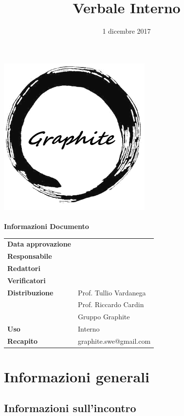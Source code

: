 \documentclass[openany,12pt,a4paper]{article}
\title{Verbale Interno}
\author{}
\date{1 dicembre 2017}
\begin{document}
	\makeatletter
	\begin{titlepage}
		\setlength{\headsep}{0pt}  
		\begin{center}
			\includegraphics[width=0.5\linewidth]{Logo.png}\\[1em]
			{\huge \bfseries  \@title }\\[10ex]
			\textbf{\Large Informazioni Documento} \\[2em]
			\bgroup
			\def\arraystretch{1.5}
			\begin{tabular}{l|l}
				\textbf{Data approvazione} & \large \@date \\
				\textbf{Responsabile} &  \\
				\textbf{Redattori} &  \\
				\textbf{Verificatori} &  \\
				\textbf{Distribuzione} & Prof. Tullio Vardanega \\
				 & Prof. Riccardo Cardin \\
				 & Gruppo Graphite \\
				\textbf{Uso} & Interno \\
				\textbf{Recapito} & graphite.swe@gmail.com \\
			\end{tabular}
		\egroup
		\end{center}
	\end{titlepage}
	\makeatother

	\thispagestyle{empty}
	\newpage
	
	\tableofcontents
	\newpage
	
	\section{Informazioni generali}
	
	\subsection{Informazioni sull'incontro}
	
\end{document}
